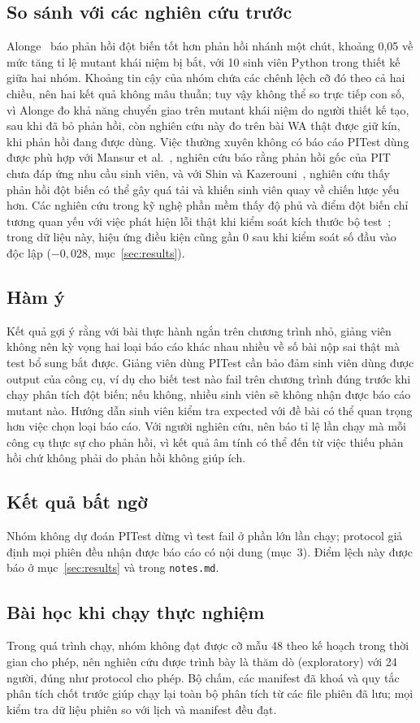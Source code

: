 \subsection{So sánh với các nghiên cứu trước}
Alonge~\cite{alonge2025} báo phản hồi đột biến tốt hơn phản hồi nhánh một chút, khoảng 0,05 về mức tăng tỉ lệ mutant khái niệm bị bắt, với 10 sinh viên Python trong thiết kế giữa hai nhóm.
Khoảng tin cậy của nhóm chứa các chênh lệch cỡ đó theo cả hai chiều, nên hai kết quả không mâu thuẫn; tuy vậy không thể so trực tiếp con số, vì Alonge đo khả năng chuyển giao trên mutant khái niệm do người thiết kế tạo, sau khi đã bỏ phản hồi, còn nghiên cứu này đo trên bài WA thật được giữ kín, khi phản hồi đang được dùng.
Việc thường xuyên không có báo cáo PITest dùng được phù hợp với Mansur et al.~\cite{mansur2026}, nghiên cứu báo rằng phản hồi gốc của PIT chưa đáp ứng nhu cầu sinh viên, và với Shin và Kazerouni~\cite{shin2024}, nghiên cứu thấy phản hồi đột biến có thể gây quá tải và khiến sinh viên quay về chiến lược yếu hơn.
Các nghiên cứu trong kỹ nghệ phần mềm thấy độ phủ và điểm đột biến chỉ tương quan yếu với việc phát hiện lỗi thật khi kiểm soát kích thước bộ test~\cite{inozemtseva2014,papadakis2018}; trong dữ liệu này, hiệu ứng điều kiện cũng gần 0 sau khi kiểm soát số đầu vào độc lập ($-0,028$, mục~\ref{sec:results}).

\subsection{Hàm ý}
Kết quả gợi ý rằng với bài thực hành ngắn trên chương trình nhỏ, giảng viên không nên kỳ vọng hai loại báo cáo khác nhau nhiều về số bài nộp sai thật mà test bổ sung bắt được.
Giảng viên dùng PITest cần bảo đảm sinh viên dùng được output của công cụ, ví dụ cho biết test nào fail trên chương trình đúng trước khi chạy phân tích đột biến; nếu không, nhiều sinh viên sẽ không nhận được báo cáo mutant nào.
Hướng dẫn sinh viên kiểm tra expected với đề bài có thể quan trọng hơn việc chọn loại báo cáo.
Với người nghiên cứu, nên báo tỉ lệ lần chạy mà mỗi công cụ thực sự cho phản hồi, vì kết quả âm tính có thể đến từ việc thiếu phản hồi chứ không phải do phản hồi không giúp ích.

\subsection{Kết quả bất ngờ}
Nhóm không dự đoán PITest dừng vì test fail ở phần lớn lần chạy; protocol giả định mọi phiên đều nhận được báo cáo có nội dung (mục~3).
Điểm lệch này được báo ở mục~\ref{sec:results} và trong \texttt{notes.md}.

\subsection{Bài học khi chạy thực nghiệm}
Trong quá trình chạy, nhóm không đạt được cỡ mẫu 48 theo kế hoạch trong thời gian cho phép, nên nghiên cứu được trình bày là thăm dò (exploratory) với 24 người, đúng như protocol cho phép.
Bộ chấm, các manifest đã khoá và quy tắc phân tích chốt trước giúp chạy lại toàn bộ phân tích từ các file phiên đã lưu; mọi kiểm tra dữ liệu phiên so với lịch và manifest đều đạt.